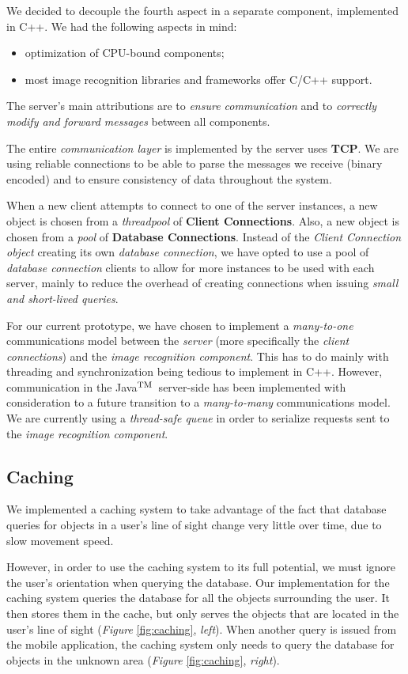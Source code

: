 \documentclass[a4paper,onecolumn,oneside,titlepage,11pt]{report}
\def\tm{\leavevmode\hbox{$\rm {}^{TM}$}}
\begin{document}
We decided to decouple the fourth aspect in a separate component, implemented in C++. We had the following aspects in mind:
\begin{itemize}
	\item optimization of CPU-bound components;
	\item most image recognition libraries and frameworks offer C/C++ support.
\end{itemize}
The server's main attributions are to \emph{ensure communication} and to \emph{correctly modify and forward messages} between all components.

The entire \emph{communication layer} is implemented by the server uses \textbf{TCP}. We are using reliable connections to be able to parse the messages we receive (binary encoded) and to ensure consistency of data throughout the system.

When a new client attempts to connect to one of the server instances, a new object is chosen from a \emph{threadpool} of \textbf{Client Connections}. Also, a new object is chosen from a \emph{pool} of \textbf{Database Connections}. Instead of the \emph{Client Connection object} creating its own \emph{database connection}, we have opted to use a pool of \emph{database connection} clients to allow for more instances to be used with each server, mainly to reduce the overhead of creating connections when issuing \emph{small and short-lived queries}.

For our current prototype, we have chosen to implement a \emph{many-to-one} communications model between the \emph{server} (more specifically the \emph{client connections}) and the \emph{image recognition component}. This has to do mainly with threading and synchronization being tedious to implement in C++. However, communication in the Java\tm\ server-side has been implemented with consideration to a future transition to a \emph{many-to-many} communications model. We are currently using a \emph{thread-safe queue} in order to serialize requests sent to the \emph{image recognition component}.

\subsection{Caching}
We implemented a caching system to take advantage of the fact that database queries for objects in a user's line of sight change very little over time, due to slow movement speed.

However, in order to use the caching system to its full potential, we must ignore the user's orientation when querying the database. Our implementation for the caching system queries the database for all the objects surrounding the user. It then stores them in the cache, but only serves the objects that are located in the user's line of sight (\emph{Figure} \ref{fig:caching}, \emph{left}). When another query is issued from the mobile application, the caching system only needs to query the database for objects in the unknown area (\emph{Figure} \ref{fig:caching}, \emph{right}).
\end{document}
